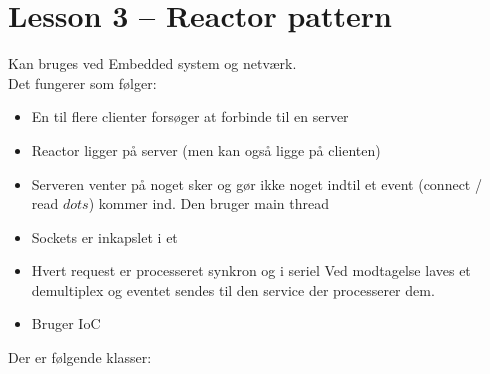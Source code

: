 \documentclass[10pt, a4]{Memoir}
\begin{document}
\newpage
\section{Lesson 3 -- Reactor pattern}

Kan bruges ved Embedded system og netværk.
\\
Det fungerer som følger:

\begin{itemize}
\item En til flere clienter forsøger at forbinde til en server
\item Reactor ligger på server (men kan også ligge på clienten)

\item Serveren venter på noget sker og gør ikke noget indtil et event (connect / read $dots$) kommer ind.
\subitem Den bruger main thread

\item Sockets er inkapslet i et 
\item Hvert request er processeret synkron og i seriel
\subitem Ved modtagelse laves et demultiplex og eventet sendes til den service der processerer dem.
\item Bruger IoC
\end{itemize}
Der er følgende klasser:
\end{document}
